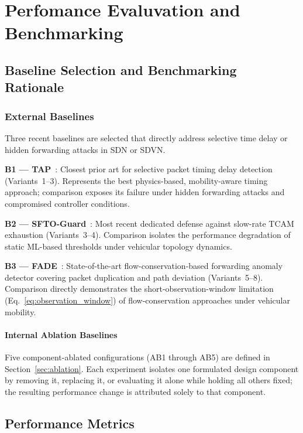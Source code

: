 \documentclass[12pt, a4paper]{report}
\begin{document}
{{\chapter{Perfomance Evaluvation and Benchmarking}
\section{Baseline Selection and Benchmarking Rationale}
\label{sec:baselines}

\subsection{External Baselines}
Three recent baselines are selected that directly address selective
time delay or hidden forwarding attacks in SDN or SDVN.

\textbf{B1 — TAP}~\cite{Arsalan2018}: Closest prior art for
selective packet timing delay detection (Variants~1--3).
Represents the best physics-based, mobility-aware timing approach;
comparison exposes its failure under hidden forwarding attacks and
compromised controller conditions.

\textbf{B2 — SFTO-Guard}~\cite{Tang2023SFTO}: Most recent dedicated
defense against slow-rate TCAM exhaustion (Variants~3--4). Comparison
isolates the performance degradation of static ML-based thresholds
under vehicular topology dynamics.

\textbf{B3 — FADE}~\cite{Zhang2021FADE}: State-of-the-art
flow-conservation-based forwarding anomaly detector covering packet
duplication and path deviation (Variants~5--8). Comparison directly
demonstrates the short-observation-window limitation
(Eq.~\eqref{eq:observation_window}) of flow-conservation approaches
under vehicular mobility.

\subsubsection{Internal Ablation Baselines}
Five component-ablated configurations
(AB1 through AB5) are defined in
Section~\ref{sec:ablation}. Each experiment
isolates one formulated design component by
removing it, replacing it, or evaluating it
alone while holding all others fixed; the
resulting performance change is attributed
solely to that component.

\section{Performance Metrics}
\label{sec:performance_metrics}
\label{sec:metrics}

}}
\end{document}
